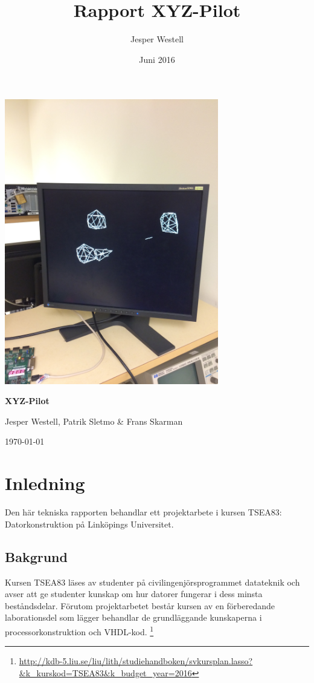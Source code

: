 \documentclass[a4paper]{article}
\title{Rapport XYZ-Pilot}
\author{Jesper Westell}
\date{Juni 2016}
\begin{document}
    \begin{titlepage}

    	\vspace{2cm}
        \centering
        \includegraphics[width=0.7\textwidth]{title_img.jpeg} \par
    	{\huge\bfseries XYZ-Pilot\par}
        \vspace{1cm}
        \large{Jesper Westell, Patrik Sletmo \& Frans Skarman}

    	\vfill

        \large{\today}
    \end{titlepage}

    \tableofcontents
    \newpage
    
    \section{Inledning}
    Den här tekniska rapporten behandlar ett projektarbete i kursen TSEA83:
    Datorkonstruktion på Linköpings Universitet.





    \subsection{Bakgrund}
    Kursen TSEA83 läses av studenter på civilingenjörsprogrammet datateknik och
    avser att ge studenter kunskap om hur datorer fungerar i dess minsta
    beståndsdelar. Förutom projektarbetet består kursen av en förberedande
    laborationsdel som lägger behandlar de grundläggande kunskaperna i
    processorkonstruktion och VHDL-kod. \footnote{\url{
http://kdb-5.liu.se/liu/lith/studiehandboken/svkursplan.lasso?&k_kurskod=TSEA83&k_budget_year=2016}}
    
\end{document}
